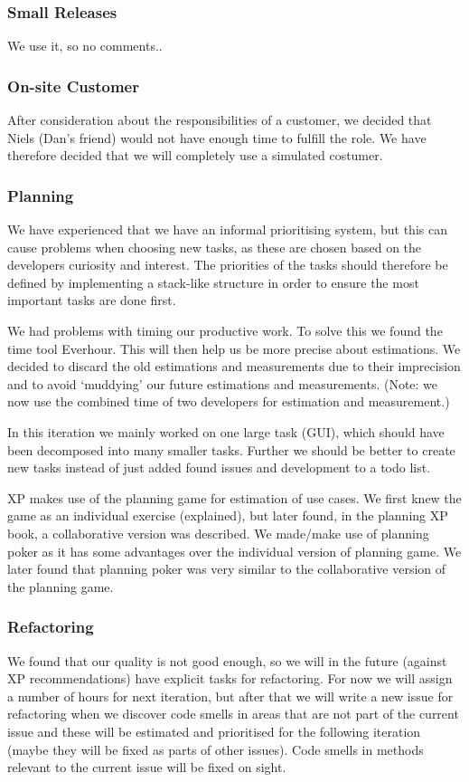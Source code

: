 \subsubsection{Small Releases}
We use it, so no comments..

\subsubsection{On-site Customer}
After consideration about the responsibilities of a customer, we decided that Niels (Dan’s friend) would not have enough time to fulfill the role.
We have therefore decided that we will completely use a simulated costumer.

\subsubsection{Planning}
We have experienced that we have an informal prioritising system, but this can cause problems when choosing new tasks, as these are chosen based on the developers curiosity and interest. The priorities of the tasks should therefore be defined by implementing a stack-like structure in order to ensure the most important tasks are done first.

We had problems with timing our productive work. To solve this we found the time tool Everhour.
This will then help us be more precise about estimations.
We decided to discard the old estimations and measurements due to their imprecision and to avoid `muddying' our future estimations and measurements. (Note: we now use the combined time of two developers for estimation and measurement.)

In this iteration we mainly worked on one large task (GUI), which should have been decomposed into many smaller tasks. Further we should be better to create new tasks instead of just added found issues and development to a todo list.

XP makes use of the planning game for estimation of use cases. We first knew the game as an individual exercise (explained), but later found, in the planning XP book, a collaborative version was described. We made/make use of planning poker as it has some advantages over the individual version of planning game. We later found that planning poker was very similar to the collaborative version of the planning game.  

\subsubsection{Refactoring}
We found that our quality is not good enough, so we will in the future (against XP recommendations) have explicit tasks for refactoring. 
For now we will assign a number of hours for next iteration, but after that we will write a new issue for refactoring when we discover code smells in areas that are not part of the current issue and these will be estimated and prioritised for the following iteration (maybe they will be fixed as parts of other issues). Code smells in methods relevant to the current issue will be fixed on sight.

